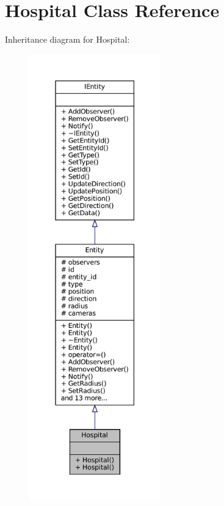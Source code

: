 \hypertarget{classHospital}{}\section{Hospital Class Reference}
\label{classHospital}


Inheritance diagram for Hospital\+:\nopagebreak
\begin{figure}[H]
\begin{center}
\leavevmode
\includegraphics[height=550pt]{classHospital__inherit__graph}
\end{center}
\end{figure}


